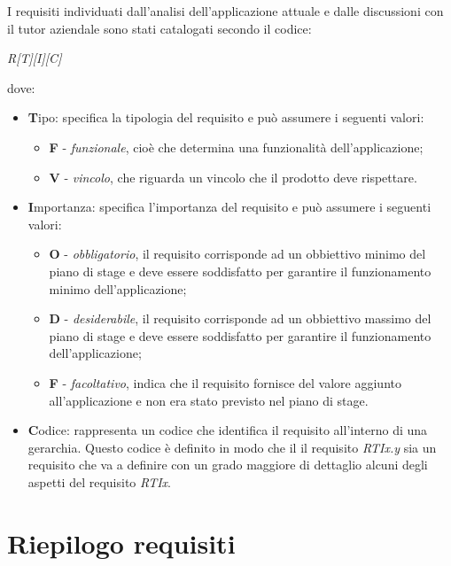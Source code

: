 I requisiti individuati dall'analisi dell'applicazione attuale e dalle discussioni con il tutor aziendale sono stati catalogati secondo il codice:
\begin{center}
\textit{R[T][I][C]}
\end{center}
dove:
\begin{itemize}
\item \textbf{T}ipo: specifica la tipologia del requisito e può assumere i seguenti valori:
	\begin{itemize}
	\item \textbf{F} - \textit{funzionale}, cioè che determina una funzionalità dell'applicazione;
	\item \textbf{V} - \textit{vincolo}, che riguarda un vincolo che il prodotto deve rispettare.
	\end{itemize}
\item \textbf{I}mportanza: specifica l'importanza del requisito e può assumere i seguenti valori:
	\begin{itemize}
	\item \textbf{O} - \textit{obbligatorio}, il requisito corrisponde ad un obbiettivo minimo del piano di stage e deve essere soddisfatto per garantire il funzionamento minimo dell'applicazione;
	\item \textbf{D} - \textit{desiderabile}, il requisito corrisponde ad un obbiettivo massimo del piano di stage e deve essere soddisfatto per garantire il funzionamento dell'applicazione;
	\item \textbf{F} - \textit{facoltativo}, indica che il requisito fornisce del valore aggiunto all'applicazione e non era stato previsto nel piano di stage.
	\end{itemize}
\item \textbf{C}odice: rappresenta un codice che identifica il requisito all'interno di una gerarchia. Questo codice è definito in modo che il il requisito \textit{RTIx.y} sia un requisito che va a definire con un grado maggiore di dettaglio alcuni degli aspetti del requisito \textit{RTIx}.
\end{itemize}




\section{Riepilogo requisiti}

